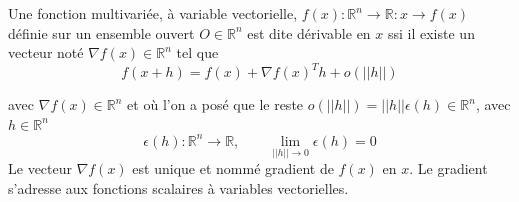 		
		Une fonction multivariée, à variable vectorielle, $ f(x)	: \mathbb{R}^n \rightarrow \mathbb{R} : x \rightarrow f(x) $ définie sur un ensemble ouvert $O \in \mathbb{R}^n$ est dite dérivable \cite{jtshiman:2021} en $x$ ssi il existe un vecteur noté $\nabla f(x) \in \mathbb{R}^n$ tel que
		\begin{equation}
		f(x+h) = f(x) + \nabla f(x)^{T}h + o(||h||)
		\end{equation}
		
		avec $\nabla f(x) \in \mathbb{R}^n$ et où l’on a posé que le reste $o(||h||) = ||h||\epsilon (h) \in \mathbb{R}^n$, avec $h \in \mathbb{R}^n$ 
		\begin{equation*}
			\epsilon (h): \mathbb{R}^n\rightarrow \mathbb{R}, \qquad \lim\limits_{||h|| \rightarrow 0} \epsilon(h)=0
		\end{equation*} 
		Le vecteur $\nabla f(x)$ est unique et nommé {gradient} de $f(x)$ en $x$.
		Le gradient s’adresse aux fonctions scalaires à variables vectorielles.
		


